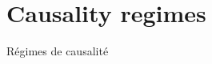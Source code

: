 
















\stars






\newpage


\section{Causality regimes}{Régimes de causalité}

\label{app:sec:causalityregimes}





